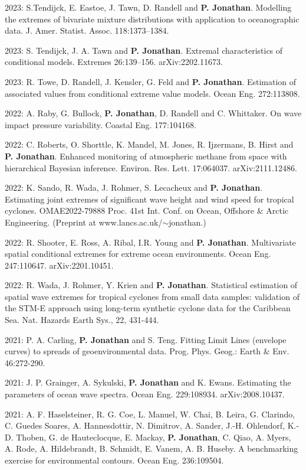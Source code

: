 \documentclass[11pt,a4paper]{moderncv}
\begin{document}
2023: S.Tendijck, E. Eastoe, J. Tawn, D. Randell and \textbf{P. Jonathan}. Modelling the extremes of bivariate mixture distributions with application to oceanographic data. J. Amer. Statist. Assoc. 118:1373--1384.

2023: S. Tendijck, J. A. Tawn and \textbf{P. Jonathan}. Extremal characteristics of conditional models. Extremes 26:139–156. arXiv:2202.11673.

2023: R. Towe, D. Randell, J. Kensler, G. Feld and \textbf{P. Jonathan}. Estimation of associated values from conditional extreme value models. Ocean Eng. 272:113808.

2022: A. Raby, G. Bullock, \textbf{P. Jonathan}, D. Randell and C. Whittaker. On wave impact pressure variability. Coastal Eng. 177:104168. 

2022: C. Roberts, O. Shorttle, K. Mandel, M. Jones, R. Ijzermans, B. Hirst and \textbf{P. Jonathan}. Enhanced monitoring of atmospheric methane from space with hierarchical Bayesian inference. Environ. Res. Lett. 17:064037. arXiv:2111.12486.

2022: K. Sando, R. Wada, J. Rohmer, S. Lecacheux and \textbf{P. Jonathan}. Estimating joint extremes of significant wave height and wind speed for tropical cyclones. OMAE2022-79888 Proc. 41st Int. Conf. on Ocean, Offshore \& Arctic Engineering. (Preprint at www.lancs.ac.uk/$\sim$jonathan.)

2022: R. Shooter, E. Ross, A. Ribal, I.R. Young and \textbf{P. Jonathan}. Multivariate spatial conditional extremes for extreme ocean environments. Ocean Eng. 247:110647. arXiv:2201.10451.

2022: R. Wada, J. Rohmer, Y. Krien and \textbf{P. Jonathan}. Statistical estimation of spatial wave extremes for tropical cyclones from small data samples: validation of the STM-E approach using long-term synthetic cyclone data for the Caribbean Sea. Nat. Hazards Earth Sys., 22, 431-444. 

2021: P. A. Carling, \textbf{P. Jonathan} and S. Teng. Fitting Limit Lines (envelope curves) to spreads of geoenvironmental data. Prog. Phys. Geog.: Earth \& Env. 46:272-290.

2021: J. P. Grainger, A. Sykulski, \textbf{P. Jonathan} and K. Ewans. Estimating the parameters of ocean wave spectra. Ocean Eng. 229:108934. arXiv:2008.10437.

2021: A. F. Haselsteiner, R. G. Coe, L. Manuel, W. Chai, B. Leira, G. Clarindo, C. Guedes Soares, A. Hannesdottir, N. Dimitrov, A. Sander, J.-H. Ohlendorf, K.-D. Thoben, G. de Hauteclocque, E. Mackay, \textbf{P. Jonathan}, C. Qiao, A. Myers, A. Rode, A. Hildebrandt, B. Schmidt, E. Vanem, A. B. Huseby. A benchmarking exercise for environmental contours. Ocean Eng. 236:109504.
\end{document}

